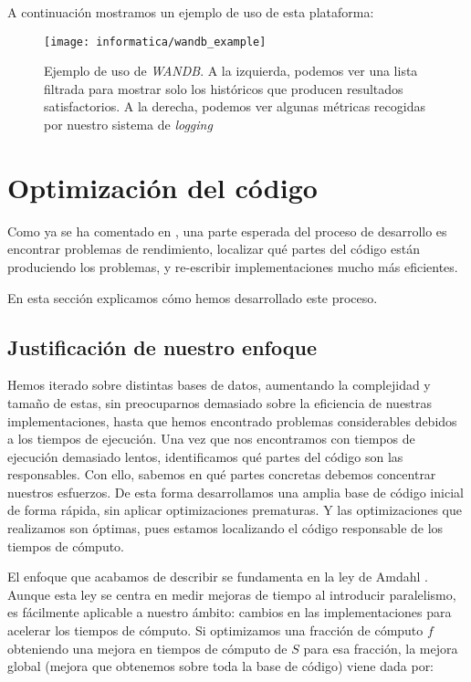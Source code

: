 A continuación mostramos un ejemplo de uso de esta plataforma:

\begin{figure}[H]
    \centering
    \texttt{[image: informatica/wandb\_example]}
    \caption{Ejemplo de uso de \textit{WANDB}. A la izquierda, podemos ver una lista filtrada para mostrar solo los históricos que producen resultados satisfactorios. A la derecha, podemos ver algunas métricas recogidas por nuestro sistema de \textit{logging}}
\end{figure}

\section{Optimización del código} \label{isec:optimizacion_codigo}

Como ya se ha comentado en , una parte esperada del proceso de desarrollo es encontrar problemas de rendimiento, localizar qué partes del código están produciendo los problemas, y re-escribir implementaciones mucho más eficientes.

En esta sección explicamos cómo hemos desarrollado este proceso.

\subsection{Justificación de nuestro enfoque}

Hemos iterado sobre distintas bases de datos, aumentando la complejidad y tamaño de estas, sin preocuparnos demasiado sobre la eficiencia de nuestras implementaciones, hasta que hemos encontrado problemas considerables debidos a los tiempos de ejecución. Una vez que nos encontramos con tiempos de ejecución demasiado lentos, identificamos qué partes del código son las responsables. Con ello, sabemos en qué partes concretas debemos concentrar nuestros esfuerzos. De esta forma desarrollamos una amplia base de código inicial de forma rápida, sin aplicar optimizaciones prematuras. Y las optimizaciones que realizamos son óptimas, pues estamos localizando el código responsable de los tiempos de cómputo.

El enfoque que acabamos de describir se fundamenta en la ley de Amdahl \cite{informatica:amdahl_original} \cite{informatica:amdahl_moderno}. Aunque esta ley se centra en medir mejoras de tiempo al introducir paralelismo, es fácilmente aplicable a nuestro ámbito: cambios en las implementaciones para acelerar los tiempos de cómputo. Si optimizamos una fracción de cómputo $f$ obteniendo una mejora en tiempos de cómputo de $S$ para esa fracción, la mejora global (mejora que obtenemos sobre toda la base de código) viene dada por:

